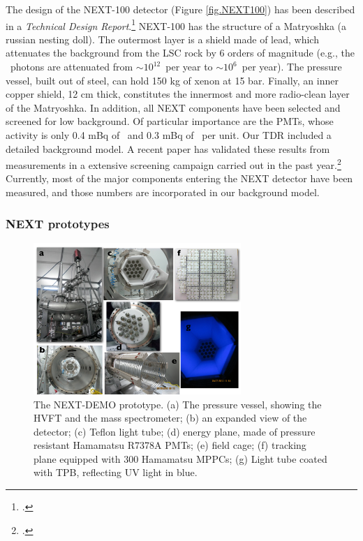 The design of the NEXT-100 detector (Figure \ref{fig.NEXT100}) has been described in a \emph{Technical Design Report}.\footcite{Alvarez:2012haa} NEXT-100 has the structure of a Matryoshka (a russian nesting doll). The outermost layer is a shield made of lead, which attenuates the background from the LSC rock by 6 orders of magnitude (e.g., the \TL\ photons are attenuated from $\sim 10^{12}$~per year to $\sim 10^{6}$~per year). The pressure vessel, built out of steel, can hold 150 kg of xenon at 15 bar. Finally, an inner copper shield, 12 cm thick, constitutes the innermost and more radio-clean layer of the Matryoshka. In addition, all NEXT components have been selected and screened for low background. Of particular importance are the PMTs, whose activity is only 0.4 mBq of \BI\ and 0.3 mBq of \TL\ per unit. Our TDR included a detailed background model. A recent paper has validated these results from measurements in a extensive screening campaign carried out in the past year.\footcite{Alvarez:2012as} Currently, most of the major components entering the NEXT detector have been measured, and those numbers are incorporated in our background model. 

\subsubsection*{NEXT prototypes}

\begin{figure}
\centering
\includegraphics[width=0.7\textwidth]{img/DEMO.pdf}
\caption{\small The NEXT-DEMO prototype. (a) The pressure vessel, showing the HVFT and the mass spectrometer; (b) an expanded view of the detector; (c) Teflon light tube; (d) energy plane, made of pressure resistant Hamamatsu R7378A PMTs; (e) field cage; (f) tracking plane equipped with 300 Hamamatsu MPPCs; (g) Light tube coated with TPB, reflecting UV light in blue.} \label{fig.DEMO}
\end{figure}

